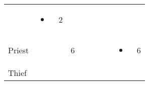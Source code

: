 \documentclass[12pt]{article}
\begin{document}
\begin{longtable}[]{@{}llllllllll@{}}
\begin{minipage}[t]{0.06\columnwidth}
\strut\end{minipage} &
\begin{minipage}[t]{0.07\columnwidth}\raggedright\strut
\begin{itemize}
\item
\end{itemize}
\strut\end{minipage} &
\begin{minipage}[t]{0.08\columnwidth}\raggedright\strut
2
\strut\end{minipage}\tabularnewline
\begin{minipage}[t]{0.13\columnwidth}\raggedright\strut
Priest
\strut\end{minipage} &
\begin{minipage}[t]{0.06\columnwidth}\raggedright\strut
\strut\end{minipage} &
\begin{minipage}[t]{0.06\columnwidth}\raggedright\strut
\strut\end{minipage} &
\begin{minipage}[t]{0.06\columnwidth}\raggedright\strut
6
\strut\end{minipage} &
\begin{minipage}[t]{0.06\columnwidth}\raggedright\strut
\strut\end{minipage} &
\begin{minipage}[t]{0.06\columnwidth}\raggedright\strut
\strut\end{minipage} &
\begin{minipage}[t]{0.06\columnwidth}\raggedright\strut
\strut\end{minipage} &
\begin{minipage}[t]{0.06\columnwidth}\raggedright\strut
\strut\end{minipage} &
\begin{minipage}[t]{0.07\columnwidth}\raggedright\strut
\begin{itemize}
\item
\end{itemize}
\strut\end{minipage} &
\begin{minipage}[t]{0.08\columnwidth}\raggedright\strut
6
\strut\end{minipage}\tabularnewline
\begin{minipage}[t]{0.13\columnwidth}\raggedright\strut
Thief
\strut\end{minipage} &
\begin{minipage}[t]{0.06\columnwidth}\raggedright\strut
\strut\end{minipage} &

\end{longtable}
\end{document}
